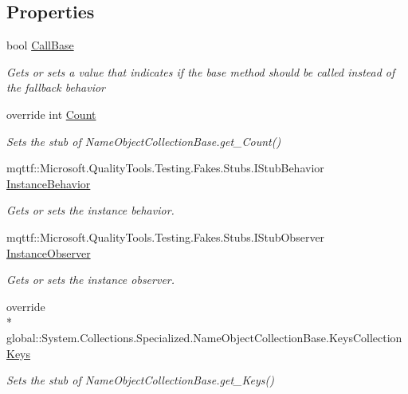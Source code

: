 \subsection*{Properties}
\begin{DoxyCompactItemize}
\item 
bool \hyperlink{class_system_1_1_collections_1_1_specialized_1_1_fakes_1_1_stub_name_object_collection_base_a233a4a43898405ddcfc6598dec99a776}{Call\-Base}
\begin{DoxyCompactList}\small\item\em Gets or sets a value that indicates if the base method should be called instead of the fallback behavior\end{DoxyCompactList}\item 
override int \hyperlink{class_system_1_1_collections_1_1_specialized_1_1_fakes_1_1_stub_name_object_collection_base_aace206c6a2391670a3dbbaf83717e4ae}{Count}
\begin{DoxyCompactList}\small\item\em Sets the stub of Name\-Object\-Collection\-Base.\-get\-\_\-\-Count()\end{DoxyCompactList}\item 
mqttf\-::\-Microsoft.\-Quality\-Tools.\-Testing.\-Fakes.\-Stubs.\-I\-Stub\-Behavior \hyperlink{class_system_1_1_collections_1_1_specialized_1_1_fakes_1_1_stub_name_object_collection_base_adb17d89a3fc64542d43ecb13f05e598b}{Instance\-Behavior}
\begin{DoxyCompactList}\small\item\em Gets or sets the instance behavior.\end{DoxyCompactList}\item 
mqttf\-::\-Microsoft.\-Quality\-Tools.\-Testing.\-Fakes.\-Stubs.\-I\-Stub\-Observer \hyperlink{class_system_1_1_collections_1_1_specialized_1_1_fakes_1_1_stub_name_object_collection_base_ac993815faebf502faf7dd64173d3c2c6}{Instance\-Observer}
\begin{DoxyCompactList}\small\item\em Gets or sets the instance observer.\end{DoxyCompactList}\item 
override \\*
global\-::\-System.\-Collections.\-Specialized.\-Name\-Object\-Collection\-Base.\-Keys\-Collection \hyperlink{class_system_1_1_collections_1_1_specialized_1_1_fakes_1_1_stub_name_object_collection_base_aa64496688748f23d40a1669d306fb9da}{Keys}
\begin{DoxyCompactList}\small\item\em Sets the stub of Name\-Object\-Collection\-Base.\-get\-\_\-\-Keys()\end{DoxyCompactList}\end{DoxyCompactItemize}


